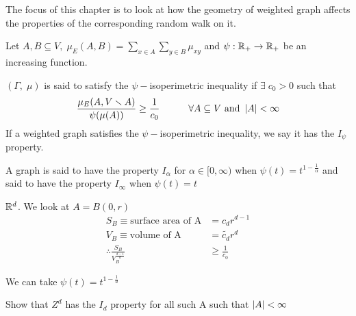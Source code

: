 \documentclass[main]{subfiles}
\begin{document}


The focus of this chapter is to look at how the geometry of weighted graph affects the properties of the corresponding random walk on it.

\begin{definition}
    Let $A, B \subseteq V, \; \mu_E(A,B) = \sum_{x \in A} \sum_{y \in B} \mu_{xy}$
    and $\psi: \mathbb R_+ \to \mathbb R_+$ be an increasing function.

    $(\Gamma,\;\mu)$ is said to satisfy the $\psi-$isoperimetric inequality if $\exists\;c_0>0$ such that
    \[\frac{\mu_E(A,V\smallsetminus A)}{\psi(\mu(A))} \geq \frac{1}{c_0} \hspace{3em} \forall A \subseteq V \text{ and }\left\lvert A\right\rvert < \infty\]
    If a weighted graph satisfies the $\psi-$isoperimetric inequality, we say it has the $I_\psi$ property.

    A graph is said to have the property $I_\alpha$ for $\alpha \in [0, \infty)$ when $\psi(t) = t^{1-\frac{1}{\alpha}}$
    and said to have the property $I_\infty$ when $\psi(t) = t$
\end{definition}

\ex
$\mathbb R^d$. We look at $A = B(0,r)$
\begin{align*}
    S_B                                       \equiv \text{surface area of A} & = c_d r^{d-1}         \\
    V_B                                       \equiv \text{volume of A}       & = \widetilde{c_d} r^d \\
    \therefore \frac{S_B}{V_B^\frac{d-1}{d}}                                  & \geq \frac{1}{c_0}
\end{align*}

We can take $\psi(t) = t^{1-\frac{1}{d}}$

Show that $Z^d$ has the $I_d$ property for all such A such that $\left\lvert A\right\rvert < \infty$\\
\end{document}
